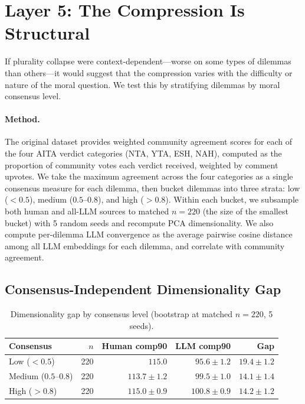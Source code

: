 \documentclass[11pt,a4paper]{article}
\begin{document}
\section{Layer 5: The Compression Is Structural}

If plurality collapse were context-dependent---worse on some types of dilemmas than others---it would suggest that the compression varies with the difficulty or nature of the moral question. We test this by stratifying dilemmas by moral consensus level.

\paragraph{Method.} The original dataset provides weighted community agreement scores for each of the four AITA verdict categories (NTA, YTA, ESH, NAH), computed as the proportion of community votes each verdict received, weighted by comment upvotes. We take the maximum agreement across the four categories as a single consensus measure for each dilemma, then bucket dilemmas into three strata: low ($< 0.5$), medium ($0.5$--$0.8$), and high ($> 0.8$). Within each bucket, we subsample both human and all-LLM sources to matched $n = 220$ (the size of the smallest bucket) with 5 random seeds and recompute PCA dimensionality. We also compute per-dilemma LLM convergence as the average pairwise cosine distance among all LLM embeddings for each dilemma, and correlate with community agreement.

\subsection{Consensus-Independent Dimensionality Gap}

\begin{table}[H]
\centering
\caption{Dimensionality gap by consensus level (bootstrap at matched $n = 220$, 5 seeds).}
\label{tab:consensus}
\begin{tabular}{lrrrr}
\toprule
Consensus & $n$ & Human comp90 & LLM comp90 & Gap \\
\midrule
Low ($<0.5$)       & 220 & $115.0$ & $95.6 \pm 1.2$  & $19.4 \pm 1.2$ \\
Medium ($0.5$--$0.8$) & 220 & $113.7 \pm 1.2$ & $99.5 \pm 1.0$  & $14.1 \pm 1.4$ \\
High ($>0.8$)      & 220 & $115.0 \pm 0.9$ & $100.8 \pm 0.9$ & $14.2 \pm 1.2$ \\
\bottomrule
\end{tabular}
\end{table}
\end{document}
